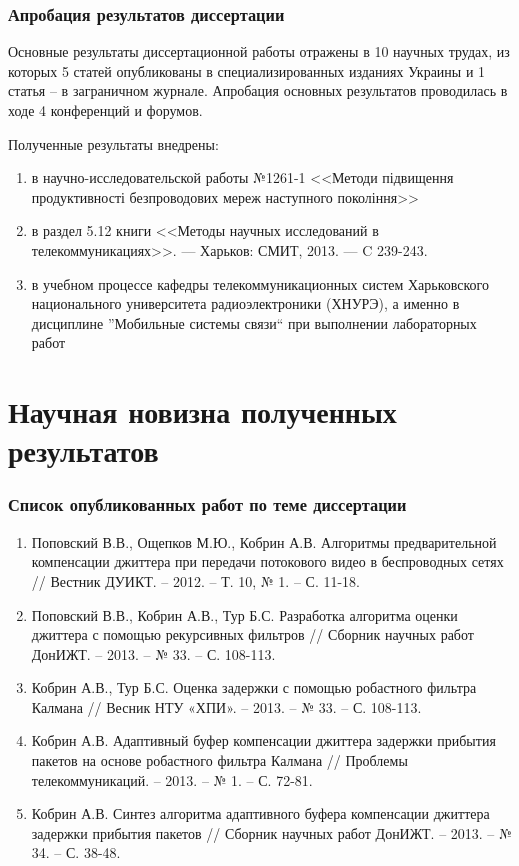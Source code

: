 \documentclass[10pt,pdf,hyperref={unicode}]{beamer}
\begin{document}
\begin{frame}
\frametitle{Апробация результатов диссертации}
Основные результаты диссертационной работы отражены в 10 научных трудах, из которых  5  статей опубликованы в специализированных изданиях Украины и 1 статья – в заграничном журнале.
Апробация основных результатов проводилась в ходе 4 конференций и форумов.

Полученные результаты внедрены: 
\begin{enumerate}
\item в научно-исследовательской работы №1261-1 <<Методи підвищення продуктивності безпроводових мереж наступного покоління>>
\item в раздел 5.12 книги <<Методы научных исследований в телекоммуникациях>>. --- Харьков: СМИТ, 2013. --- C 239-243.
\item в учебном процессе кафедры телекоммуникационных систем Харьковского национального университета радиоэлектроники (ХНУРЭ), а именно в дисциплине ''Мобильные системы связи`` при выполнении лабораторных работ
\end{enumerate}
 

\end{frame}

\section{Научная новизна полученных результатов}

\begin{frame}
\frametitle{Список опубликованных работ по теме диссертации}
{\small
\begin{enumerate}
\item Поповский В.В., Ощепков М.Ю., Кобрин А.В. Алгоритмы предварительной компенсации джиттера при передачи потокового видео в беспроводных сетях // Вестник ДУИКТ. – 2012. – Т. 10, № 1. – С. 11-18.
\item Поповский В.В., Кобрин А.В., Тур Б.С. Разработка алгоритма оценки джиттера с помощью рекурсивных фильтров // Сборник научных работ ДонИЖТ. – 2013. – № 33. – С. 108-113.
\item Кобрин А.В., Тур Б.С. Оценка задержки с помощью робастного фильтра Калмана // Весник НТУ «ХПИ». – 2013. – № 33. – С. 108-113.
\item Кобрин А.В. Адаптивный буфер компенсации джиттера задержки прибытия пакетов на основе робастного фильтра Калмана // Проблемы телекоммуникаций. – 2013. – № 1. – С. 72-81.
\item Кобрин А.В. Синтез алгоритма адаптивного буфера компенсации джиттера задержки прибытия пакетов // Сборник научных работ ДонИЖТ. – 2013. – № 34. – С. 38-48.

\end{enumerate}
}
\end{frame}
\end{document}
